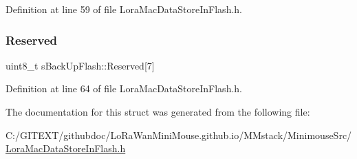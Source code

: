Definition at line 59 of file Lora\+Mac\+Data\+Store\+In\+Flash.\+h.

\mbox{\label{structs_back_up_flash_a6163ae953c8ae3245dacc92da79bce16}} 
\subsubsection{\texorpdfstring{Reserved}{Reserved}}
{\footnotesize\ttfamily uint8\+\_\+t s\+Back\+Up\+Flash\+::\+Reserved\mbox{[}7\mbox{]}}



Definition at line 64 of file Lora\+Mac\+Data\+Store\+In\+Flash.\+h.



The documentation for this struct was generated from the following file\+:\begin{DoxyCompactItemize}
\item 
C\+:/\+G\+I\+T\+E\+X\+T/githubdoc/\+Lo\+Ra\+Wan\+Mini\+Mouse.\+github.\+io/\+M\+Mstack/\+Minimouse\+Src/\mbox{\hyperlink{_lora_mac_data_store_in_flash_8h}{Lora\+Mac\+Data\+Store\+In\+Flash.\+h}}\end{DoxyCompactItemize}
